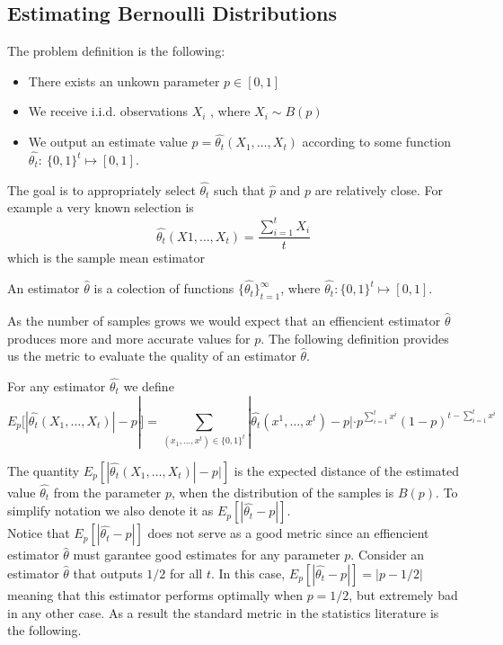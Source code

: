 \subsection{Estimating Bernoulli Distributions}
The problem definition is the following:
\begin{itemize}
\item There exists an unkown parameter $p \in [0,1]$
\item We receive i.i.d. observations $X_i$ , where $X_i\sim B(p)$ 
\item We output an estimate value $\hat{p}=\hat{\theta_t}(X_1,\ldots,X_t)$ according to some function $\hat{\theta_t}:~ \{0,1\}^t\mapsto [0,1]$.
 \end{itemize}
The goal is to appropriately select $\hat{\theta_t}$ such that $\hat{p}$ and $p$ are relatively close. For example a very known selection is $$\hat{\theta_t}(X1,\ldots,X_t)= \frac{\sum_{i=1}^t X_i}{t}$$ which is the sample mean estimator

\begin{definition}
An estimator $\hat{\theta}$ is a colection of functions $\{\hat{\theta_t}\}_{t=1}^{\infty}$, where $\hat{\theta_t}: \{0,1\}^t\mapsto [0,1]$.
\end{definition} As the number of samples grows we would expect that an effiencient estimator $\hat{\theta}$ produces more and more accurate values for $p$. The following definition provides us the metric to evaluate the quality of an estimator $\hat{\theta}$. 

\begin{definition}
For any estimator $\hat{\theta_t}$ we define 
$$E_p[|\hat{\theta_t}(X_1,\ldots,X_t)| - p|]= \sum_{(x_1,\ldots,x^t)\in \{0,1\}^t}|\hat{\theta_t}(x^1,\ldots,x^t) -p| \cdot p^{\sum_{i=1}^tx^i}(1-p)^{t-\sum_{i=1}^tx^i}$$ 
\end{definition}
The quantity $E_p[|\hat{\theta_t}(X_1,\ldots,X_t)| - p|]$ is the expected distance of the estimated value $\hat{\theta_t}$ from the parameter $p$, when the distribution of the samples is $B(p)$. To simplify notation we also denote it as $E_p[|\hat{\theta_t} - p|]$.\\

\noindent Notice that $E_p[|\hat{\theta_t}-p|]$ does not serve as a good metric since an effiencient estimator $\hat{\theta}$ must garantee good estimates for any parameter $p$. Consider an estimator $\hat{\theta}$ that outputs $1/2$ for all $t$. In this case, $E_{p}[|\hat{\theta_t}- p|]=|p-1/2|$ meaning that this estimator performs optimally when $p=1/2$, but extremely bad in any other case. As a result the standard metric in the statistics literature is the following.

